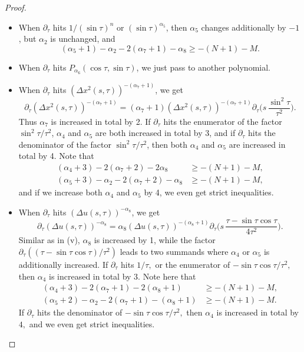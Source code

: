 \documentclass[leqno]{amsart}
\theoremstyle{definition}
\theoremstyle{remark}
\numberwithin{equation}{section}
\begin{document}
\begin{proof}
\begin{itemize}
\item[(iii)] When $\partial_\tau$ hits $1/(\sin\tau)^{n}$ or $(\sin \tau)^{\alpha_5}$, then $\alpha_5$ changes additionally by  $-1$, but $\alpha_2$ is unchanged, and 
\[
(\alpha_5 + 1)-\alpha_2-2(\alpha_7 + 1)-\alpha_8  \ge -(N + 1)-M.
\]
\item[(iv)] When $\partial_\tau$ hits $P_{\alpha_6}(\cos\tau,\sin\tau)$, we just pass to another polynomial.

\item[(v)] When $\partial_\tau$ hits $(\Delta x^2 (s,\tau))^{-(\alpha_7+1)}$, we get
\[
\partial_\tau (\Delta x^2 (s,\tau))^{-(\alpha_7+1)}
 =( \alpha_7+1) (\Delta x^2 (s,\tau))^{-(\alpha_7 + 1)} \partial_\tau\Big( s \, \frac{\sin^2\tau}{\tau^2} \Big).
\]
Thus $\alpha_7$ is increased in total by 2. If $\partial_\tau$ hits the enumerator  of the factor $\sin^2\tau/\tau^2$, $\alpha_ 4 $ and $\alpha_5$ are both increased in total by 3, and if $\partial_\tau$ hits the denominator   of the factor $\sin^2\tau/\tau^2$, then both $\alpha_ 4 $ and $\alpha_5$ are increased in total by 4.   Note that
\begin{align*}
(\alpha_ 4 + 3 )-2(\alpha_7 + 2)-2\alpha_8 & \ge -(N + 1)-M, \\
(\alpha_5 + 3)-\alpha_2-2(\alpha_7 + 2)-\alpha_8 & \ge -(N + 1)-M,
\end{align*}
and if we increase both $\alpha_4$ and $\alpha_5$ by 4, we even get strict inequalities.

\item[(vi)] When $\partial_\tau$ hits $(\Delta u(s,\tau))^{-\alpha_8}$, we get
\[
\partial_\tau \left(\Delta u(s,\tau)\right)^{-\alpha_8}
 = \alpha_8 \left(\Delta u(s,\tau)\right)^{-(\alpha_8 + 1)} \partial_\tau\Big( s \, \frac{\tau-\sin\tau\cos\tau}{4\tau^2} \Big).
\]
Similar as in (v), $\alpha_8$ is increased by 1, while the factor $\partial_\tau( (\tau-\sin\tau\cos\tau)/\tau^2 )$ leads to two summands where $\alpha_ 4 $ or $\alpha_5$ is additionally increased.  If $\partial_\tau$ hits $1/\tau,$ or the enumerator of $-\sin\tau\cos\tau/\tau^2,$ then $\alpha_4$ is increased in total by $3$. Note here that
\begin{align*}
(\alpha_ 4 + 3 )-2(\alpha_7 + 1)-2(\alpha_8 + 1) &\ge -(N + 1)-M,\\
(\alpha_5 + 2)-\alpha_2-2(\alpha_7 + 1)-(\alpha_8 + 1) &\ge -(N + 1)-M.
\end{align*}
If $\partial_\tau$ hits  the denominator of $-\sin\tau\cos\tau/\tau^2,$ then $\alpha_4$ is increased in total by $4,$ and we even get strict inequalities.
\end{itemize}


\end{proof}
\end{document}
